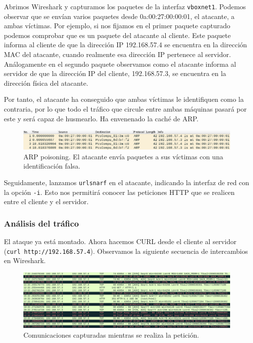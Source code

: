 \documentclass[11pt]{article}
\begin{document}
Abrimos Wireshark y capturamos los paquetes de la interfaz \texttt{vboxnet1}. Podemos observar que se envían varios paquetes desde 0a:00:27:00:00:01, el atacante, a ambas víctimas. Por ejemplo, si nos fijamos en el primer paquete capturado podemos comprobar que es un paquete del atacante al cliente. Este paquete informa al cliente de que la dirección IP 192.168.57.4 se encuentra en la dirección MAC del atacante, cuando realmente esa dirección IP pertenece al servidor. Análogamente en el segundo paquete observamos como el atacante informa al servidor de que la dirección IP del cliente, 192.168.57.3, se encuentra en la dirección física del atacante.

Por tanto, el atacante ha conseguido que ambas víctimas le identifiquen como la contraria, por lo que todo el tráfico que circule entre ambas máquinas pasará por este y será capaz de husmearlo. Ha envenenado la caché de ARP.

\begin{figure}[H]
	\centering
	\includegraphics[width=140mm]{images/atack1/wireshark-arp}
	\caption{ARP poisoning. El atacante envía paquetes a sus víctimas con una identificación falsa.}
	\label{fig:wireshark-arp}
\end{figure}

Seguidamente, lanzamos \texttt{urlsnarf} en el atacante, indicando la interfaz de red con la opción \texttt{-i}. Esto nos permitirá
conocer las peticiones HTTP que se realicen entre el cliente y el servidor.

\subsubsection*{Análisis del tráfico}

El ataque ya está montado. Ahora hacemos CURL desde el cliente al servidor (\verb|curl http://192.168.57.4|).
Observamos la siguiente secuencia de intercambios en Wireshark.

\begin{figure}[H]
	\centering
	\includegraphics[width=170mm]{images/atack1/request}
	\caption{Comunicaciones capturadas mientras se realiza la petición.}
	\label{fig:request}
\end{figure}
\end{document}
